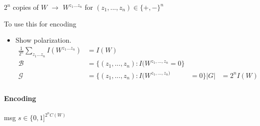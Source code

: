 \documentclass{article}
\begin{document}
$2^n$ copies of $W$ $\to$ $W^{z_1...z_n}$ for $(z_1,...,z_n)\in \{+,-\}^n$

To use this for encoding
\begin{itemize}
\item Show polarization.
\begin{align*}
\frac{1}{2^n}\sum_{z_1...z_n}I(W^{z_1...z_n})&=I(W)\\
\mathcal{B} & = \{ (z_1,...,z_n): I(W^{z_1,...,z_n}=0\}\\
\mathcal{G} & = \{ (z_1,...,z_n): I(W^{z_1,...,z_n)}&=0\}
|G|&=2^nI(W)\\
\end{align*}
\end{itemize}

\paragraph{Encoding} msg $s\in \{0,1]^{2^nC(W)}$

\end{document}
